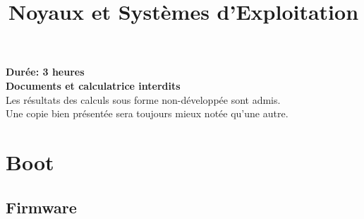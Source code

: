 %
%
%
%
%
%
%

%
%

\def\path{../../..}

%
%



%
%
\usepackage[utf8]{inputenc}
\usepackage{enumitem}
\usepackage{geometry}



%
%

\title{Noyaux et Systèmes d'Exploitation}

%
%

\rhead{}

%
%

\maketitle

%
%

\indentation{}

%
%

\begin{center}

\textbf{Durée: 3 heures}\\
\textbf{Documents et calculatrice interdits}\\
\scriptsize{Les résultats des calculs sous forme non-développée sont admis.}\\
\scriptsize{Une copie bien présentée sera toujours mieux notée qu'une autre.}

\end{center}

%
%

%
%

\section{{Boot}
         {\hfill{} }}

\subsection{Firmware}

